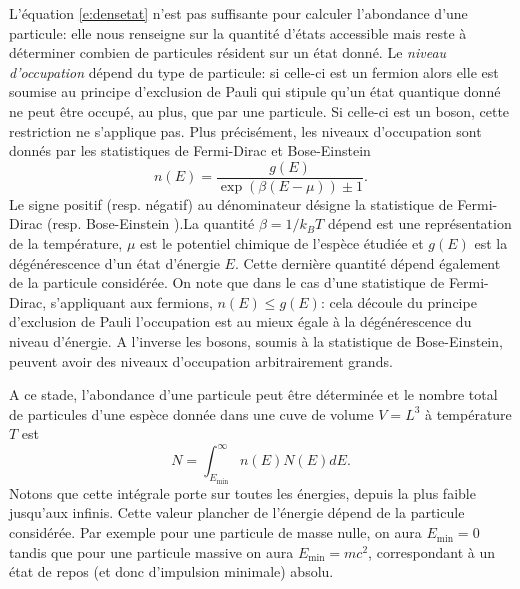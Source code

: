 L'équation \ref{e:densetat} n'est pas suffisante pour calculer l'abondance d'une particule: elle nous renseigne sur la quantité d'états accessible mais reste à déterminer combien de particules résident sur un état donné. Le \textit{niveau d'occupation} dépend du type de particule: si celle-ci est un fermion alors elle est soumise au principe d'exclusion de Pauli qui stipule qu'un état quantique donné ne peut être occupé, au plus, que par une particule. Si celle-ci est un boson, cette restriction ne s'applique pas. Plus précisément, les niveaux d'occupation sont donnés par les statistiques de Fermi-Dirac et Bose-Einstein
\begin{equation}
n(E)=\frac{g(E)}{\exp(\beta(E-\mu))\pm 1}.
\label{e:BEFD}
\end{equation}
Le signe positif (resp. négatif) au dénominateur désigne la statistique de Fermi-Dirac (resp. Bose-Einstein ).La quantité $\beta=1/k_B T$ dépend est une représentation de la température, $\mu$ est le potentiel chimique de l'espèce étudiée et $g(E)$ est la dégénérescence d'un état d'énergie $E$. Cette dernière quantité dépend également de la particule considérée. On note que dans le cas d'une statistique de Fermi-Dirac, s'appliquant aux fermions, $n(E)\le g(E)$: cela découle du principe d'exclusion de Pauli l'occupation est au mieux égale à la dégénérescence du niveau d'énergie. A l'inverse les bosons, soumis à la statistique de Bose-Einstein, peuvent avoir des niveaux d'occupation arbitrairement grands.

A ce stade, l'abondance d'une particule peut être déterminée et le nombre total de particules d'une espèce donnée dans une cuve de volume $V=L^3$ à température $T$ est
\begin{equation}
N=\int_{E_{\mathrm{min}}}^\infty n(E)N(E) dE.
\label{e:abondance}
\end{equation}
Notons que cette intégrale porte sur toutes les énergies, depuis la plus faible jusqu'aux infinis. Cette valeur plancher de l'énergie dépend de la particule considérée. Par exemple pour une particule de masse nulle, on aura $E_\mathrm{min}=0$ tandis que pour une particule massive on aura $E_\mathrm{min}=mc^2$, correspondant à un état de repos (et donc d'impulsion minimale) absolu.


